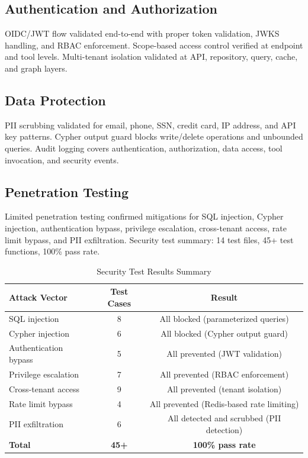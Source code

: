 \documentclass[a4paper,twoside]{sapthesis}
\begin{document}
\subsection{Authentication and Authorization}

OIDC/JWT flow validated end-to-end with proper token validation, JWKS handling, and RBAC enforcement. Scope-based access control verified at endpoint and tool levels. Multi-tenant isolation validated at API, repository, query, cache, and graph layers.

\subsection{Data Protection}

PII scrubbing validated for email, phone, SSN, credit card, IP address, and API key patterns. Cypher output guard blocks write/delete operations and unbounded queries. Audit logging covers authentication, authorization, data access, tool invocation, and security events.

\subsection{Penetration Testing}

Limited penetration testing confirmed mitigations for SQL injection, Cypher injection, authentication bypass, privilege escalation, cross-tenant access, rate limit bypass, and PII exfiltration. Security test summary: 14 test files, 45+ test functions, 100\% pass rate.

\begin{table}[ht]
\centering
\caption{Security Test Results Summary}
\label{tab:security-results}
\small
\begin{tabular}{lcc}
    \hline
    Attack Vector & Test Cases & Result \\
    \hline
    SQL injection & 8 & All blocked (parameterized queries) \\
    Cypher injection & 6 & All blocked (Cypher output guard) \\
    Authentication bypass & 5 & All prevented (JWT validation) \\
    Privilege escalation & 7 & All prevented (RBAC enforcement) \\
    Cross-tenant access & 9 & All prevented (tenant isolation) \\
    Rate limit bypass & 4 & All prevented (Redis-based rate limiting) \\
    PII exfiltration & 6 & All detected and scrubbed (PII detection) \\
    \hline
    \textbf{Total} & \textbf{45+} & \textbf{100\% pass rate} \\
    \hline
\end{tabular}
\end{table}
\end{document}
